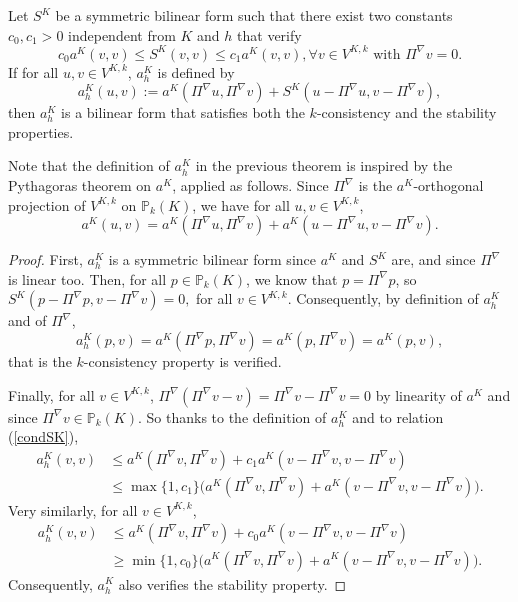 \begin{theorem} \label{introSK}
Let $S^K$  be a symmetric bilinear form such that there exist two constants $c_0, c_1>0$ independent from $K$ and $h$ that verify
\begin{equation} \label{condSK}
c_0 a^K(v,v) \leq S^K(v,v) \leq c_1a^K(v,v), \forall v\in V^{K,k} \text{ with } \Pi^\nabla v = 0.
\end{equation}
If for all $u,v\in V^{K,k}$, $a_h^K$ is defined by $$a_h^K(u,v):= a^K(\Pi^\nabla u, \Pi^\nabla v) + S^K(u-\Pi^\nabla u, v-\Pi^\nabla v),$$ then $a_h^K$ is a bilinear form that satisfies both the $k$-consistency and the stability properties.
\end{theorem}

\begin{remark}
Note that the definition of $a_h^K$ in the previous theorem is inspired by the Pythagoras theorem on $a^K$, applied as follows. Since $\Pi^\nabla$ is the $a^K$-orthogonal projection of $V^{K,k}$ on $\mathbb{P}_k(K)$, we have for all $u,v\in V^{K,k}$,
$$
a^K(u,v) = a^K(\Pi^\nabla u, \Pi^\nabla v) + a^K(u-\Pi^\nabla u, v-\Pi^\nabla v).
$$
\end{remark}

\begin{proof}
First, $a_h^K$ is a symmetric bilinear form since $a^K$ and $S^K$ are, and since $\Pi^\nabla$ is linear too. Then, for all $p\in \mathbb{P}_k(K)$, we know that $p=\Pi^\nabla p$, so $S^K(p-\Pi^\nabla p, v-\Pi^\nabla v)=0,$ for all $v\in V^{K,k}$. Consequently, by definition of $a_h^K$ and of $\Pi^\nabla$, $$a_h^K(p,v) = a^K(\Pi^\nabla p, \Pi^\nabla v) = a^K(p, \Pi^\nabla v) = a^K(p,v),$$
that is the $k$-consistency property is verified. 

Finally, for all $v\in V^{K,k}$, $\Pi^\nabla\left(\Pi^\nabla v - v\right) = \Pi^\nabla v - \Pi^\nabla v = 0$ by linearity of $a^K$ and since $\Pi^\nabla v\in \mathbb{P}_k(K)$. So thanks to the definition of $a_h^K$ and to relation (\ref{condSK}), 
\begin{align*}
a_h^K(v,v)&\leq a^K(\Pi^\nabla v, \Pi^\nabla v) + c_1a^K(v-\Pi^\nabla v, v-\Pi^\nabla v)\\
&\leq \max\{1,c_1\}\big(a^K(\Pi^\nabla v, \Pi^\nabla v) + a^K(v-\Pi^\nabla v, v-\Pi^\nabla v)\big).
\end{align*}
Very similarly, for all $v\in V^{K,k}$, 
\begin{align*}
a_h^K(v,v)&\leq a^K(\Pi^\nabla v, \Pi^\nabla v) + c_0a^K(v-\Pi^\nabla v, v-\Pi^\nabla v)\\
&\geq \min\{1,c_0\}\big(a^K(\Pi^\nabla v, \Pi^\nabla v) + a^K(v-\Pi^\nabla v, v-\Pi^\nabla v)\big).
\end{align*}
Consequently, $a_h^K$ also verifies the stability property.
\end{proof}

